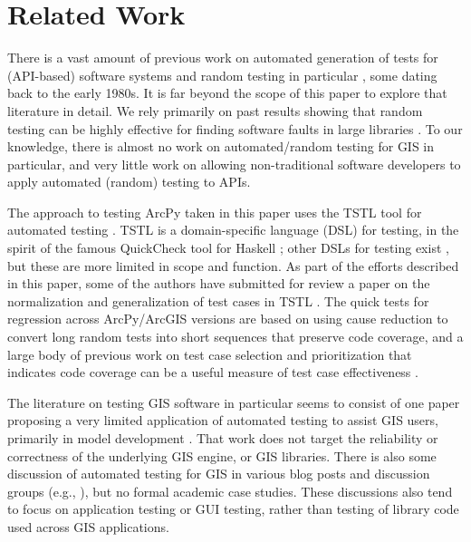\section{Related Work}

There is a vast amount of previous work on automated generation of
tests for (API-based) software systems
\cite{Pacheco,FA11,GodefroidKS05} and random testing in particular
\cite{ICSEDiff,Pacheco,AMFL11,ARTChen,ISSTAART,FASE,HamletOnly,Hamlet94,ClaessenH00,CiupaLOM07,RandFormal,WODA08,andrews-etal-rute-rt,ASE08,evalrand,csmith},
some dating back to the early 1980s. It is far beyond the scope of
this paper to explore that literature in detail.  We rely primarily on past
results showing that random testing can be highly effective for
finding software faults in large libraries
\cite{Pacheco,ICSEDiff,RandFormal,CFV08,AMAI}.  To our knowledge, there is almost
no work on automated/random testing for GIS in particular, and very
little work on allowing non-traditional software developers to apply
automated (random) testing to APIs.

The approach to testing ArcPy taken in this paper uses the TSTL tool
for automated testing \cite{NFM15,ISSTA15,tstl}.  TSTL is a
domain-specific language (DSL) \cite{Fow10} for testing, in the spirit
of the famous QuickCheck tool for Haskell \cite{ClaessenH00}; other
DSLs for testing exist \cite{UDITA}, but these are more limited in
scope and function.  As part of the efforts described in this paper,
some of the authors have submitted for review a paper on the
normalization and generalization of test cases in TSTL
\cite{ICSTnorm}.  The quick tests for regression across ArcPy/ArcGIS
versions are based on using cause reduction
\cite{icst2014,stvrcausereduce} to convert long random tests into
short sequences that preserve code coverage, and a large body of
previous work on test case selection and prioritization that indicates
code coverage \cite{ISSTA13,ICSE14Cov} can be a useful measure of test
case effectiveness
\cite{SelectTest,YooHarman,Graves:2001:ESR:367008.367020}.

The literature on testing GIS software in particular seems to consist
of one paper proposing a very limited application of automated testing
to assist GIS users, primarily in model development \cite{GISTest}.
That work does not target the reliability or correctness of the
underlying GIS engine, or GIS libraries.  There is also some
discussion of automated testing for GIS in various blog posts and
discussion groups (e.g., \cite{gisblog1,gisblog2}), but no formal
academic case studies.  These discussions also tend to focus on
application testing or GUI testing, rather than testing of library
code used across GIS applications.

